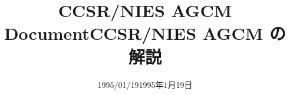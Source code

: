﻿\documentclass[a4j,12pt]{jarticle}
\title{CCSR/NIES AGCM Document}
\date{1995/01/19}
\begin{document}
%
\title{\Huge CCSR/NIES AGCM の解説}
\author{}
\date{1995年1月19日}
\maketitle
\tableofcontents
\clearpage
{}

%




















%
\end{document}
